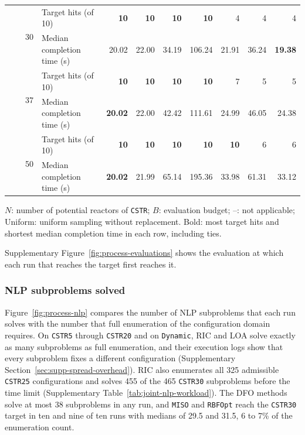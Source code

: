 \documentclass{article}
\begin{document}
\begin{table}[htbp]
\begin{threeparttable}
\begin{tabular}{@{}lrrlrrrrrrr@{}}
\addlinespace[2pt]
 &  & \multirow{2}{*}{30} & Target hits (of 10) & \textbf{10} & \textbf{10} & \textbf{10} & \textbf{10} & 4 & 4 & 4 \\
 & &  & Median completion time (s) & 20.02 & 22.00 & 34.19 & 106.24 & 21.91 & 36.24 & \textbf{19.38} \\
\addlinespace[2pt]
 &  & \multirow{2}{*}{37} & Target hits (of 10) & \textbf{10} & \textbf{10} & \textbf{10} & \textbf{10} & 7 & 5 & 5 \\
 & &  & Median completion time (s) & \textbf{20.02} & 22.00 & 42.42 & 111.61 & 24.99 & 46.05 & 24.38 \\
\addlinespace[2pt]
 &  & \multirow{2}{*}{50} & Target hits (of 10) & \textbf{10} & \textbf{10} & \textbf{10} & \textbf{10} & \textbf{10} & 6 & 6 \\
 & &  & Median completion time (s) & \textbf{20.02} & 21.99 & 65.14 & 195.36 & 33.98 & 61.31 & 33.12 \\
\bottomrule
\end{tabular}
\begin{tablenotes}[flushleft]\footnotesize
\item \(N\): number of potential reactors of \texttt{CSTR}; \(B\): evaluation budget; --: not applicable; Uniform: uniform sampling without replacement.
Bold: most target hits and shortest median completion time in each row, including ties.
\end{tablenotes}
\end{threeparttable}
\end{table}

Supplementary Figure~\ref{fig:process-evaluations} shows the evaluation at which each run that reaches the target first reaches it.

\subsubsection{NLP subproblems solved}
Figure~\ref{fig:process-nlp} compares the number of NLP subproblems that each run solves with the number that full enumeration of the configuration domain requires.
On \texttt{CSTR5} through \texttt{CSTR20} and on \texttt{Dynamic}, RIC and LOA solve exactly as many subproblems as full enumeration, and their execution logs show that every subproblem fixes a different configuration (Supplementary Section~\ref{sec:supp-spread-overhead}).
RIC also enumerates all 325 admissible \texttt{CSTR25} configurations and solves 455 of the 465 \texttt{CSTR30} subproblems before the time limit (Supplementary Table~\ref{tab:joint-nlp-workload}).
The DFO methods solve at most 38 subproblems in any run, and \texttt{MISO} and \texttt{RBFOpt} reach the \texttt{CSTR30} target in ten and nine of ten runs with medians of 29.5 and 31.5, 6 to 7\% of the enumeration count.
\end{document}
